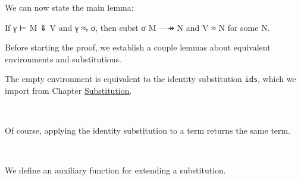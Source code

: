 We can now state the main lemma:

\begin{myDisplay}
If γ ⊢ M ⇓ V  and  γ ≈ₑ σ,
then  subst σ M —↠ N  and  V ≈ N  for some N.
\end{myDisplay}

Before starting the proof, we establish a couple lemmas about equivalent
environments and substitutions.

The empty environment is equivalent to the identity substitution
\texttt{ids}, which we import from Chapter
\protect\hyperlink{Substitution}{Substitution}.

\begin{fence}
\begin{code}%
\>[0]\AgdaSpace{}%
\AgdaSymbol{:}\AgdaSpace{}%
\AgdaSpace{}%
\AgdaSpace{}%
\<%
\\
\>[0]\AgdaSpace{}%
\AgdaSymbol{\{()\}}\<%
\end{code}
\end{fence}

Of course, applying the identity substitution to a term returns the same
term.

\begin{fence}
\begin{code}%
\>[0]\AgdaSpace{}%
\AgdaSymbol{:}\AgdaSpace{}%
\AgdaSymbol{\}}\AgdaSpace{}%
\AgdaSymbol{\{}\AgdaSymbol{\}}\AgdaSpace{}%
\AgdaSymbol{\{}\AgdaSpace{}%
\AgdaSymbol{:}\AgdaSpace{}%
\AgdaSpace{}%
\AgdaSpace{}%
\AgdaSymbol{\}}\AgdaSpace{}%
\AgdaSpace{}%
\AgdaSpace{}%
\AgdaSpace{}%
\AgdaSpace{}%
\AgdaSpace{}%
\<%
\\
\>[0]\AgdaSpace{}%
\AgdaSymbol{=}\AgdaSpace{}%
\<%
\end{code}
\end{fence}

We define an auxiliary function for extending a substitution.

